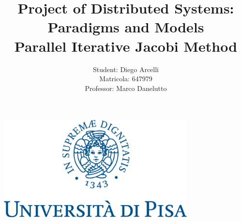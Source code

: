 \documentclass[12pt]{article}
\begin{document}
	
	\begin{titlepage}
		
		\title{Project of Distributed Systems: Paradigms and Models \\
		Parallel Iterative Jacobi Method}
		\author{Student: Diego Arcelli\\ Matricola: 647979 \\
			Professor: Marco  Danelutto}
		\maketitle
		\centering
		\includegraphics[width=10cm]{./images/unipi_logo.png}
		
	\end{titlepage}
	
	\tableofcontents
	\newpage
	
\end{document}
